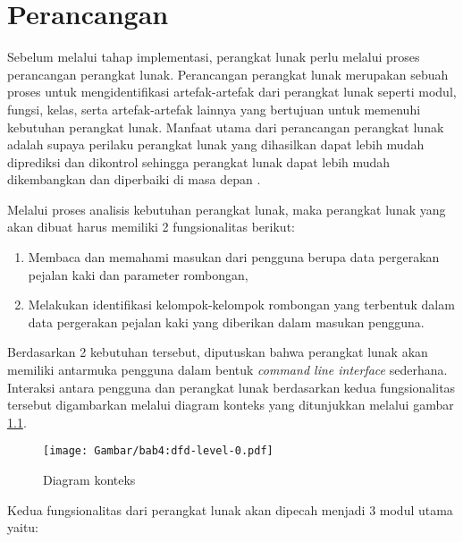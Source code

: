 \chapter{Perancangan}
\label{chap:perancangan}

Sebelum melalui tahap implementasi, perangkat lunak perlu melalui proses perancangan perangkat lunak. Perancangan perangkat lunak merupakan sebuah proses untuk mengidentifikasi artefak-artefak dari perangkat lunak seperti modul, fungsi, kelas, serta artefak-artefak lainnya yang bertujuan untuk memenuhi kebutuhan perangkat lunak. Manfaat utama dari perancangan perangkat lunak adalah supaya perilaku perangkat lunak yang dihasilkan dapat lebih mudah diprediksi dan dikontrol sehingga perangkat lunak dapat lebih mudah dikembangkan dan diperbaiki di masa depan \cite{budgen:04:software-design}.

Melalui proses analisis kebutuhan perangkat lunak, maka perangkat lunak yang akan dibuat harus memiliki 2 fungsionalitas berikut:

\begin{enumerate}
    \item Membaca dan memahami masukan dari pengguna berupa data pergerakan pejalan kaki dan parameter rombongan,
    \item Melakukan identifikasi kelompok-kelompok rombongan yang terbentuk dalam data pergerakan pejalan kaki yang diberikan dalam masukan pengguna.
\end{enumerate}

Berdasarkan 2 kebutuhan tersebut, diputuskan bahwa perangkat lunak akan memiliki antarmuka pengguna dalam bentuk \textit{command line interface} sederhana. Interaksi antara pengguna dan perangkat lunak berdasarkan kedua fungsionalitas tersebut digambarkan melalui diagram konteks yang ditunjukkan melalui gambar \ref{bab4:context-diagram}.

\begin{figure}[h]
    \centering
    \texttt{[image: Gambar/bab4:dfd-level-0.pdf]}
    \caption{Diagram konteks}
    \label{bab4:context-diagram}
\end{figure}

\noindent Kedua fungsionalitas dari perangkat lunak akan dipecah menjadi 3 modul utama yaitu:

